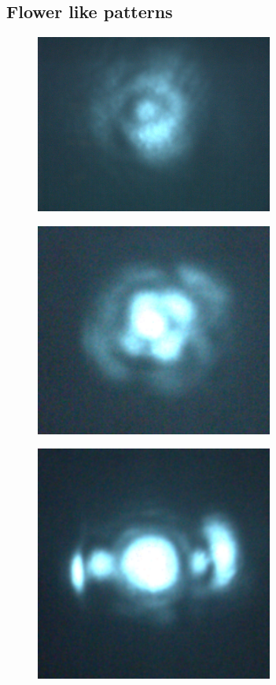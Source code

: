 \documentclass[aps,twocolumn,secnumarabic,balancelastpage,amsmath,amssymb,nofootinbib]{revtex4}
\begin{document}
\subsection{Flower like patterns}
\begin{figure}
  \includegraphics[width=7.8cm]{cone.png}
  \caption{}
  \label{cone}
\end{figure}
\begin{figure}
  \includegraphics[width=7.8cm]{flower1.png}
  \caption{}
  \label{flower1}
\end{figure}
\begin{figure}
  \includegraphics[width=7.8cm]{flower2.png}
  \caption{}
  \label{flower1}
\end{figure}
\end{document}
